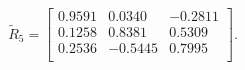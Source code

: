 \begin{equation*}
\widetilde{R}_{5} = 
\begin{bmatrix}
  0.9591 &   0.0340 &  -0.2811 \\
  0.1258 &   0.8381 &   0.5309 \\
  0.2536 &  -0.5445 &   0.7995 \\
\end{bmatrix}.
\end{equation*}
